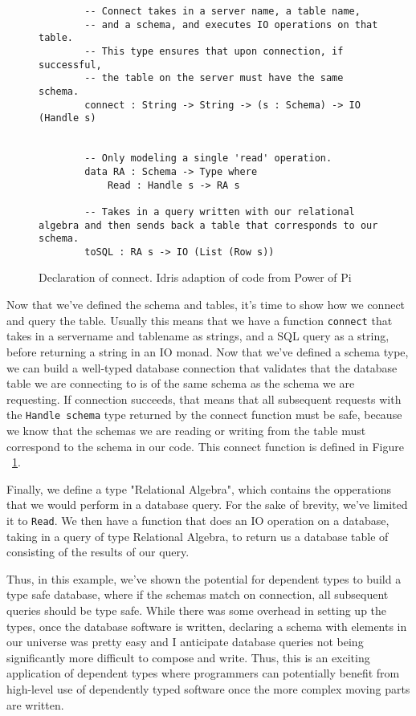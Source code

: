 \begin{figure}[ht!]
    \caption{Declaration of connect. Idris adaption of code from Power of Pi
    \protect\cite{power_of_pi}}
    \label{connect}
    \begin{lstlisting}
        -- Connect takes in a server name, a table name, 
        -- and a schema, and executes IO operations on that table. 
        -- This type ensures that upon connection, if successful, 
        -- the table on the server must have the same schema. 
        connect : String -> String -> (s : Schema) -> IO (Handle s)

        
        -- Only modeling a single 'read' operation. 
        data RA : Schema -> Type where
            Read : Handle s -> RA s
        
        -- Takes in a query written with our relational algebra and then sends back a table that corresponds to our schema. 
        toSQL : RA s -> IO (List (Row s))
    \end{lstlisting}
\end{figure}

Now that we've defined the schema and tables, it's time to show how we connect
and query the table. Usually this means that we have a function \texttt{connect}
that takes in a servername and tablename as strings, and a SQL query as a
string, before returning a string in an IO monad. Now that we've defined a
schema type, we can build a well-typed database connection that validates that
the database table we are connecting to is of the same schema as the schema we
are requesting. If connection succeeds, that means that all subsequent requests
with the \texttt{Handle schema} type returned by the connect function must be
safe, because we know that the schemas we are reading or writing from the table
must correspond to the schema in our code. This connect function is defined in
Figure ~\ref{connect}. 

Finally, we define a type "Relational Algebra", which contains the opperations
that we would perform in a database query. For the sake of brevity, we've 
limited it to \texttt{Read}. We then have a function that does an IO operation
on a database, taking in a query of type Relational Algebra, to return us
a database table of consisting of the results of our query. 

Thus, in this example, we've shown the potential for dependent types to build a
type safe database, where if the schemas match on connection, all subsequent
queries should be type safe. While there was some overhead in setting up the
types, once the database software is written, declaring a schema with elements
in our universe was pretty easy and I anticipate database queries not being
significantly more difficult to compose and write. Thus, this is an exciting
application of dependent types where programmers can potentially benefit from
high-level use of dependently typed software once the more complex moving parts
are written. 

